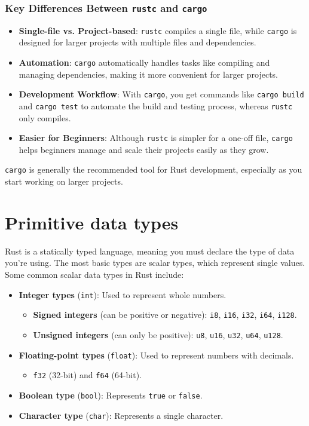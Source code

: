 \documentclass[a4paper,12pt]{report}
\begin{document}
	\subsubsection*{Key Differences Between \texttt{rustc} and \texttt{cargo}}
	\begin{itemize}
		\item \textbf{Single-file vs. Project-based}: \texttt{rustc} compiles a single file, while \texttt{cargo} is designed for larger projects with multiple files and dependencies.
		\item \textbf{Automation}: \texttt{cargo} automatically handles tasks like compiling and managing dependencies, making it more convenient for larger projects.
		\item \textbf{Development Workflow}: With \texttt{cargo}, you get commands like \texttt{cargo build} and \texttt{cargo test} to automate the build and testing process, whereas \texttt{rustc} only compiles.
		\item \textbf{Easier for Beginners}: Although \texttt{rustc} is simpler for a one-off file, \texttt{cargo} helps beginners manage and scale their projects easily as they grow.
	\end{itemize}
	
		\noindent \texttt{cargo} is generally the recommended tool for Rust development, especially as you start working on larger projects.
	
	
	
	\section{Primitive data types}

Rust is a statically typed language, meaning you must declare the type of data you're using. The most basic types are scalar types, which represent single values. Some common scalar data types in Rust include:

\begin{itemize}
	\item \textbf{Integer types} (\texttt{int}): Used to represent whole numbers.
	\begin{itemize}
		\item \textbf{Signed integers} (can be positive or negative): \texttt{i8}, \texttt{i16}, \texttt{i32}, \texttt{i64}, \texttt{i128}.
		\item \textbf{Unsigned integers} (can only be positive): \texttt{u8}, \texttt{u16}, \texttt{u32}, \texttt{u64}, \texttt{u128}.
	\end{itemize}
	\item \textbf{Floating-point types} (\texttt{float}): Used to represent numbers with decimals.
	\begin{itemize}
		\item \texttt{f32} (32-bit) and \texttt{f64} (64-bit).
	\end{itemize}
	\item \textbf{Boolean type} (\texttt{bool}): Represents \texttt{true} or \texttt{false}.
	\item \textbf{Character type} (\texttt{char}): Represents a single character.
\end{itemize}
\end{document}
